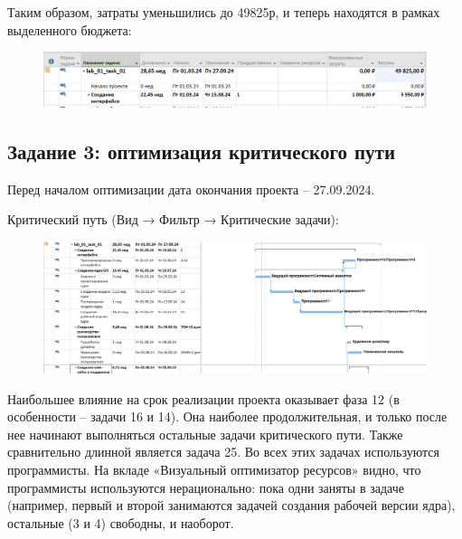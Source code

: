 \newpage

Таким образом, затраты уменьшились до 49825р, и теперь находятся в рамках
выделенного бюджета:

\begin{figure}[h!]
	\begin{center}
		\includegraphics[scale=0.48]{inc/img/p_13.png}
	\end{center}
	\captionsetup{justification=centering}
	\label{fig:u3}
\end{figure}

\clearpage

\subsection*{Задание 3: оптимизация критического пути}

Перед началом оптимизации дата окончания проекта – 27.09.2024.

Критический путь (Вид → Фильтр → Критические задачи):

\begin{figure}[h!]
	\begin{center}
		\includegraphics[scale=0.35]{inc/img/p_14.png}
	\end{center}
	\captionsetup{justification=centering}
	\label{fig:u3}
\end{figure}

Наибольшее влияние на срок реализации проекта оказывает фаза 12 (в особенности – задачи 16 и 14). Она наиболее продолжительная, и только после нее начинают выполняться остальные задачи критического пути. Также
сравнительно длинной является задача 25.
Во всех этих задачах используются программисты.
На вкладе «Визуальный оптимизатор ресурсов» видно, что программисты используются нерационально: пока одни заняты в задаче (например, первый и второй занимаются задачей создания рабочей версии ядра), остальные (3 и 4)
свободны, и наоборот.

